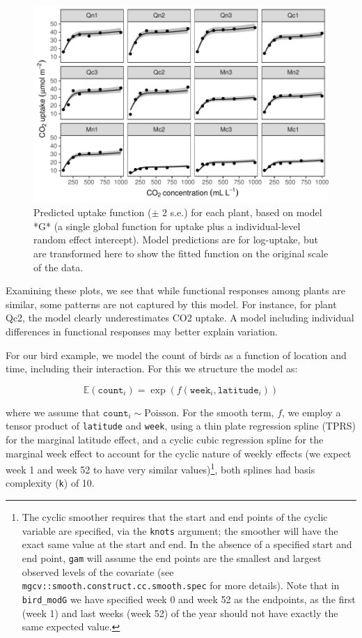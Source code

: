 \documentclass[12pt]{article}
\let\rmarkdownfootnote\footnote%
\def\footnote{\protect\rmarkdownfootnote}
\begin{document}
\begin{figure}
\includegraphics[width=\linewidth]{../figures/co2_modG_ggplot-1} \caption{\label{fig:co2_modG_predict} Predicted uptake function ($\pm$ 2 s.e.) for each plant, based on model *G* (a single global function for uptake plus a individual-level random effect intercept). Model predictions are for log-uptake, but are transformed here to show the fitted function on the original scale of the data.}\label{fig:co2_modG_ggplot}
\end{figure}

Examining these plots, we see that while functional responses among
plants are similar, some patterns are not captured by this model. For
instance, for plant Qc2, the model clearly underestimates CO2 uptake. A
model including individual differences in functional responses may
better explain variation.

For our bird example, we model the count of birds as a function of
location and time, including their interaction. For this we structure
the model as:

\[
\mathbb{E}(\texttt{count}_i) = \exp(f(\texttt{week}_i, \texttt{latitude}_i))
\]

where we assume that \(\texttt{count}_i \sim\text{Poisson}\). For the
smooth term, \(f\), we employ a tensor product of \texttt{latitude} and
\texttt{week}, using a thin plate regression spline (TPRS) for the
marginal latitude effect, and a cyclic cubic regression spline for the
marginal week effect to account for the cyclic nature of weekly effects
(we expect week 1 and week 52 to have very similar values)\footnote{The
  cyclic smoother requires that the start and end points of the cyclic
  variable are specified, via the \texttt{knots} argument; the smoother
  will have the exact same value at the start and end. In the absence of
  a specified start and end point, \texttt{gam} will assume the end
  points are the smallest and largest observed levels of the covariate
  (see \texttt{mgcv::smooth.construct.cc.smooth.spec} for more details).
  Note that in \texttt{bird\_modG} we have specified week 0 and week 52
  as the endpoints, as the first (week 1) and last weeks (week 52) of
  the year should not have exactly the same expected value.}, both
splines had basis complexity (\texttt{k}) of 10.
\end{document}
